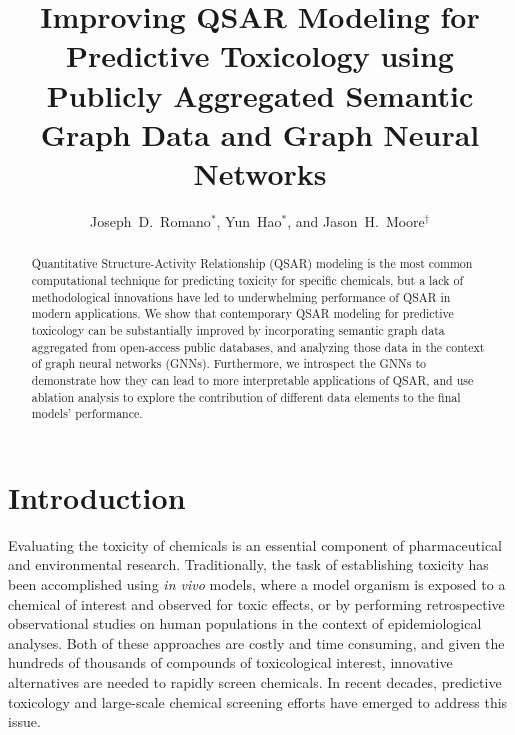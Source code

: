 \documentclass{ws-procs11x85}
\begin{document}
\title{Improving QSAR Modeling for Predictive Toxicology using Publicly Aggregated Semantic Graph Data and Graph Neural Networks}

\author{Joseph~D.~Romano$^*$, Yun~Hao$^*$, and Jason~H.~Moore$^\dag$}

\address{Institute for Biomedical Informatics, University of Pennsylvania,\\
Philadelphia, Pennsylvania 19104, United States\\
$^\dag$Corresponding author e-mail: jhmoore@upenn.edu\\
$^*$These authors contributed equally.}

\begin{abstract}
Quantitative Structure-Activity Relationship (QSAR) modeling is the most common computational technique for predicting toxicity for specific chemicals, but a lack of methodological innovations have led to underwhelming performance of QSAR in modern applications.
We show that contemporary QSAR modeling for predictive toxicology can be substantially improved by incorporating semantic graph data aggregated from open-access public databases, and analyzing those data in the context of graph neural networks (GNNs).
Furthermore, we introspect the GNNs to demonstrate how they can lead to more interpretable applications of QSAR, and use ablation analysis to explore the contribution of different data elements to the final models' performance.
\end{abstract}


\section{Introduction}\label{introduction}
Evaluating the toxicity of chemicals is an essential component of pharmaceutical and environmental research.
Traditionally, the task of establishing toxicity has been accomplished using \textit{in vivo} models, where a model organism is exposed to a chemical of interest and observed for toxic effects, or by performing retrospective observational studies on human populations in the context of epidemiological analyses.
Both of these approaches are costly and time consuming, and given the hundreds of thousands of compounds of toxicological interest, innovative alternatives are needed to rapidly screen chemicals.
In recent decades, predictive toxicology and large-scale chemical screening efforts have emerged to address this issue.
\end{document}
